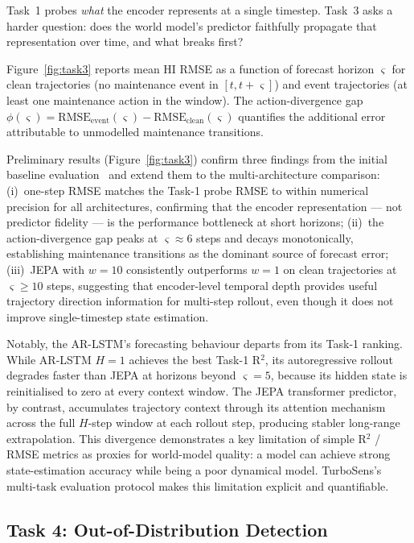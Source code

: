 Task~1 probes \emph{what} the encoder represents at a single timestep.
Task~3 asks a harder question: does the world model's predictor faithfully
propagate that representation over time, and what breaks first?

Figure~\ref{fig:task3} reports mean HI RMSE as a function of forecast horizon
$\varsigma$ for clean trajectories (no maintenance event in $[t, t{+}\varsigma]$)
and event trajectories (at least one maintenance action in the window).
The action-divergence gap $\phi(\varsigma) = \mathrm{RMSE}_{\mathrm{event}}(\varsigma)
- \mathrm{RMSE}_{\mathrm{clean}}(\varsigma)$ quantifies the additional error
attributable to unmodelled maintenance transitions.

Preliminary results (Figure~\ref{fig:task3}) confirm three findings from the
initial baseline evaluation~\cite{TODO} and extend them to the multi-architecture
comparison:
(i)~one-step RMSE matches the Task-1 probe RMSE to within numerical precision
for all architectures, confirming that the encoder representation — not predictor
fidelity — is the performance bottleneck at short horizons;
(ii)~the action-divergence gap peaks at $\varsigma{\approx}6$ steps and decays
monotonically, establishing maintenance transitions as the dominant source of
forecast error;
(iii)~JEPA with $w{=}10$ consistently outperforms $w{=}1$ on clean trajectories
at $\varsigma{\geq}10$ steps, suggesting that encoder-level temporal depth
provides useful trajectory direction information for multi-step rollout, even
though it does not improve single-timestep state estimation.

Notably, the AR-LSTM's forecasting behaviour departs from its Task-1 ranking.
While AR-LSTM $H{=}1$ achieves the best Task-1 R$^2$, its autoregressive
rollout degrades faster than JEPA at horizons beyond $\varsigma{=}5$, because
its hidden state is reinitialised to zero at every context window.
The JEPA transformer predictor, by contrast, accumulates trajectory context
through its attention mechanism across the full $H$-step window at each
rollout step, producing stabler long-range extrapolation.
This divergence demonstrates a key limitation of simple R$^2$ / RMSE metrics
as proxies for world-model quality: a model can achieve strong state-estimation
accuracy while being a poor dynamical model.  TurboSens's multi-task evaluation
protocol makes this limitation explicit and quantifiable.


\subsection{Task 4: Out-of-Distribution Detection}
\label{sec:task4}

